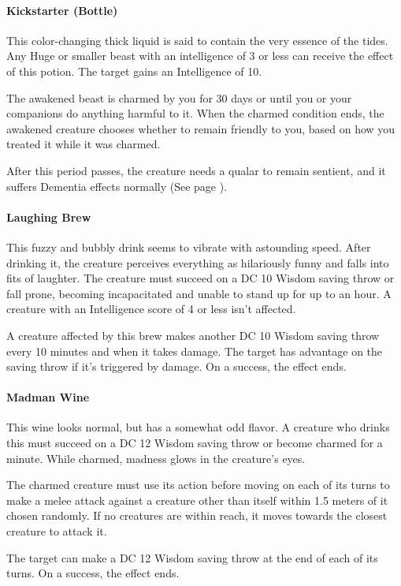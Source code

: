 \paragraph{Kickstarter (Bottle)} %
    This color-changing thick liquid is said to contain the very essence of the tides.
    Any Huge or smaller beast with an intelligence of 3 or less can receive the effect of this potion.
    The target gains an Intelligence of 10.

    The awakened beast is charmed by you for 30 days or until you or your companions do anything harmful to it.
    When the charmed condition ends, the awakened creature chooses whether to remain friendly to you, based on how you treated it while it was charmed.

    After this period passes, the creature needs a qualar to remain sentient, and it suffers Dementia effects normally (See page \pageref{ssec::dementia}).
\paragraph{Laughing Brew} %
    This fuzzy and bubbly drink seems to vibrate with astounding speed.
    After drinking it, the creature perceives everything as hilariously funny and falls into fits of laughter.
    The creature must succeed on a DC 10 Wisdom saving throw or fall prone, becoming incapacitated and unable to stand up for up to an hour.
    A creature with an Intelligence score of 4 or less isn't affected.

    A creature affected by this brew makes another DC 10 Wisdom saving throw every 10 minutes and when it takes damage.
    The target has advantage on the saving throw if it's triggered by damage.
    On a success, the effect ends.
\paragraph{Madman Wine} %
    This wine looks normal, but has a somewhat odd flavor.
    A creature who drinks this must succeed on a DC 12 Wisdom saving throw or become charmed for a minute.
    While charmed, madness glows in the creature's eyes.

    The charmed creature must use its action before moving on each of its turns to make a melee attack against a creature other than itself within 1.5 meters of it chosen randomly.
    If no creatures are within reach, it moves towards the closest creature to attack it.

    The target can make a DC 12 Wisdom saving throw at the end of each of its turns.
    On a success, the effect ends.
